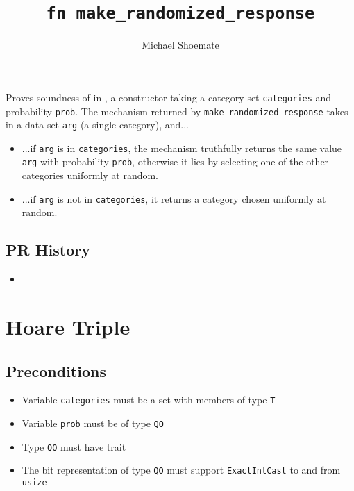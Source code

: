 \documentclass{article}
\title{\texttt{fn make\_randomized\_response}}
\author{Michael Shoemate}
\begin{document}
\maketitle

\contrib

Proves soundness of  in ,
a constructor taking a category set \texttt{categories} and probability \texttt{prob}.
The mechanism returned by \texttt{make\_randomized\_response} takes in a data set \texttt{arg} (a single category), and...

\begin{itemize}
    \item ...if \texttt{arg} is in \texttt{categories},
    the mechanism truthfully returns the same value \texttt{arg} with probability \texttt{prob},
    otherwise it lies by selecting one of the other categories uniformly at random.
    \item ...if \texttt{arg} is not in \texttt{categories},
    it returns a category chosen uniformly at random.
\end{itemize}

\subsection*{PR History}
\begin{itemize}
    \item {}
\end{itemize}

\section{Hoare Triple}

\subsection*{Preconditions}
\begin{itemize}
    \item Variable \texttt{categories} must be a set with members of type \texttt{T}
    \item Variable \texttt{prob} must be of type \texttt{QO}
    \item Type \texttt{QO} must have trait 
    \item The bit representation of type \texttt{QO} must support \texttt{ExactIntCast} to and from \texttt{usize}
\end{itemize}
\end{document}
